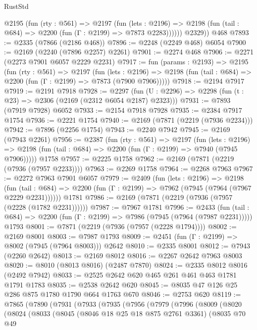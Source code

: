 \begin{lexlean}{RustStd}
\begin{coremodule}
          @2195
            (fun (rty : @561) =>
            @2197
              (fun (lets : @2196) =>
              @2198 (fun (tail : @684) => @2200 (fun (Γ : @2199) => @7873 @2283))))))
        @2329))
    @468
@7893 := @2335 (@7866 (@2186 @468))
@7896 := @2248 (@2249 @468) @6054
@7900 := @2169 (@2240 (@7896 @2257) @2261)
@7901 := @2274 @468
@7906 := @2271 (@2273 @7901 @6057 @2229 @2231)
@7917 := fun (params : @2193) =>
  @2195
    (fun (rty : @561) =>
    @2197
      (fun (lets : @2196) =>
      @2198 (fun (tail : @684) => @2200 (fun (Γ : @2199) => @7873 (@7900 @7906)))))
@7918 := @2194 @7917
@7919 := @2191 @7918
@7928 := @2297 (fun (U : @2296) => @2298 (fun (t : @23) => @2306 (@2169 (@2312 @6054 @2187) @2323)))
@7931 := @7893 (@7919 @7928) @6052
@7933 := @2154 @7918 @7928
@7935 := @2384 @7917 @1754
@7936 := @2221 @1754
@7940 := @2169 (@7871 (@2219 (@7936 @2234)))
@7942 := @7896 (@2256 @1754)
@7943 := @2240 @7942
@7945 := @2169 (@7943 @2261)
@7956 := @2387
    (fun (rty : @561) =>
    @2197
      (fun (lets : @2196) =>
      @2198 (fun (tail : @684) => @2200 (fun (Γ : @2199) => @7940 (@7945 @7906)))))
    @1758
@7957 := @2225 @1758
@7962 := @2169 (@7871 (@2219 (@7936 (@7957 @2233))))
@7963 := @2269 @1758
@7964 := @2268 @7963
@7967 := @2272 @7963 @7901 @6057
@7979 := @2409
    (fun (lets : @2196) =>
    @2198
      (fun (tail : @684) => @2200 (fun (Γ : @2199) => @7962 (@7945 (@7964 (@7967 @2229 @2231))))))
    @1781
@7986 := @2169 (@7871 (@2219 (@7936 (@7957 (@2228 (@1782 @2231))))))
@7987 := @7967 @1781
@7996 := @2433
    (fun (tail : @684) => @2200 (fun (Γ : @2199) => @7986 (@7945 (@7964 (@7987 @2231)))))
    @1793
@8001 := @7871 (@2219 (@7936 (@7957 (@2228 @1794))))
@8002 := @2169 @8001
@8003 := @7987 @1793
@8009 := @2451 (fun (Γ : @2199) => @8002 (@7945 (@7964 @8003))) @2642
@8010 := @2335 @8001
@8012 := @7943 (@2260 @2642)
@8013 := @2169 @8012
@8016 := @2267 @2642 @7963 @8003
@8020 := @8010 (@8013 @8016) (@2487 @7870)
@8024 := @2335 @8012 @8016 (@2492 @7942)
@8033 := @2525 @2642 @620 @465 @261 @461 @463 @1781 @1791 @1783
@8035 := @2538 @2642 @620
@8045 := @8035 @47 @126 @25 @286 @875 @1780 @1790 @664 @1763 @670
@8046 := @2753 @620
@8119 := @7865
    (@7890
      (@7931
        (@7933
          (@7935
            (@7956
              (@7979
                (@7996
                  (@8009
                    (@8020
                      (@8024
                        (@8033
                          (@8045
                            (@8046 @18 @25 @18 @875 @2761 @3361)
                            (@8035
                              @70
                              @49

\end{coremodule}
\end{lexlean}
